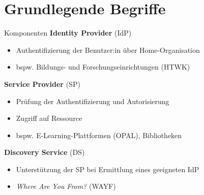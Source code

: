 
\section{Grundlegende Begriffe}

\begin{frame}{Komponenten}
    \alert{\textbf{Identity Provider}} (IdP)
    \vspace{-\topsep}
    \begin{itemize}
        \item Authentifizierung der Benutzer:in über Home-Organisation ~\cite{shibbolethShibbolethConcepts2023, dfnDFNAAIDokumentationEinfuhrung}
        \item bspw. Bildungs- und Forschungseinrichtungen (HTWK)
    \end{itemize}
    
    \pause
    \alert{\textbf{Service Provider}} (SP)
    \vspace{-\topsep}
    \begin{itemize}
        \item Prüfung der Authentifizierung und Autorisierung
        \item Zugriff auf Ressource~\cite{shibbolethShibbolethConcepts2023, shibbolethServiceProviderApplication2021, shibbolethServiceProviderProtectContent2021}
        \item bspw. E-Learning-Plattformen (OPAL), Bibliotheken~\cite{dfnDFNAAIDokumentationEinfuhrung}
    \end{itemize}
    
    \pause
    \alert{\textbf{Discovery Service}} (DS)
    \vspace{-\topsep}
    \begin{itemize}
        \item Unterstützung der SP bei Ermittlung eines geeigneten IdP
        \item \emph{Where Are You From?} (WAYF)~\cite{shibbolethShibbolethConcepts2023, shibbolethIdPDiscoveryShibbolethConcepts2020, switchSimpleDemoSwitchAAI2024}
    \end{itemize}
\end{frame}


